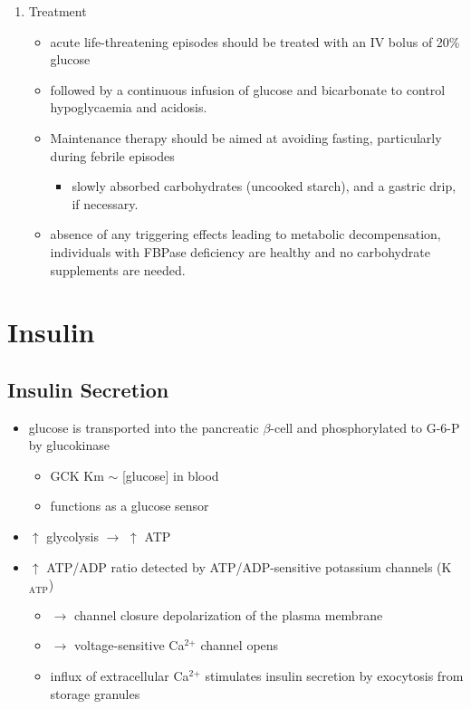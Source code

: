 \documentclass{scrartcl}
\begin{document}
\begin{enumerate}
\item Treatment
\label{sec:org7a85a26}

\begin{itemize}
\item acute life-threatening episodes should be treated with an IV bolus
of 20\% glucose
\item followed by a continuous infusion of glucose and bicarbonate to
control hypoglycaemia and acidosis.
\item Maintenance therapy should be aimed at avoiding fasting,
particularly during febrile episodes
\begin{itemize}
\item slowly absorbed carbohydrates (uncooked starch), and a gastric
drip, if necessary.
\end{itemize}
\item absence of any triggering effects leading to metabolic
decompensation, individuals with FBPase deficiency are healthy and
no carbohydrate supplements are needed.
\end{itemize}
\end{enumerate}


\section{Insulin}
\label{sec:orgdda96d3}
\subsection{Insulin Secretion}
\label{sec:org235e07e}
\begin{itemize}
\item glucose is transported into the pancreatic \(\beta\)-cell and phosphorylated to G-6-P by glucokinase
\begin{itemize}
\item GCK Km \(\sim\) [glucose] in  blood
\item functions as a glucose sensor
\end{itemize}
\item \(\uparrow\) glycolysis \(\to\) \(\uparrow\) ATP
\item \(\uparrow\) ATP/ADP ratio detected by ATP/ADP-sensitive potassium channels (K\(_{\text{ATP}}\))
\begin{itemize}
\item \(\to\) channel closure depolarization of the plasma membrane
\item \(\to\) voltage-sensitive Ca\(^{\text{2+}}\) channel opens
\item influx of extracellular Ca\(^{\text{2+}}\) stimulates insulin secretion by
exocytosis from storage granules
\end{itemize}
\end{itemize}
\end{document}
